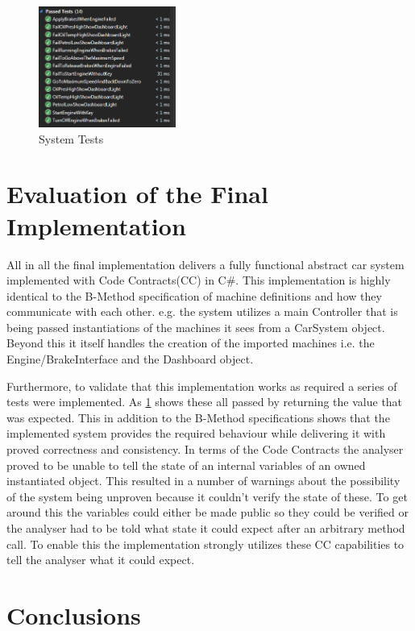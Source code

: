 \documentclass[12pt]{article}
\begin{document}
\begin{figure}[H]
	\centering
	\includegraphics[width=0.4\textwidth]{cc_tests}
	\caption{System Tests}
	\label{fig:cc2}
\end{figure}

\section{Evaluation of the Final Implementation}

All in all the final implementation delivers a fully functional abstract car system implemented with Code Contracts(CC) in C\#. This implementation is highly identical to the B-Method specification of machine definitions and how they communicate with each other. e.g. the system utilizes a main Controller that is being passed instantiations of the machines it sees from a CarSystem object. Beyond this it itself handles the creation of the imported machines i.e. the Engine/BrakeInterface and the Dashboard object.

 Furthermore, to validate that this implementation works as required a series of tests were implemented. As \ref{fig:cc2} shows these all passed by returning the value that was expected. This in addition to the B-Method specifications shows that the implemented system provides the required behaviour while delivering it with proved correctness and consistency. In terms of the Code Contracts the analyser proved to be unable to tell the state of an internal variables of an owned instantiated object. This resulted in a number of warnings about the possibility of the system being unproven because it couldn't verify the state of these. To get around this the variables could either be made public so they could be verified or the analyser had to be told what state it could expect after an arbitrary method call. To enable this the implementation strongly utilizes these CC capabilities to tell the analyser what it could expect.


\section{Conclusions}
\end{document}
